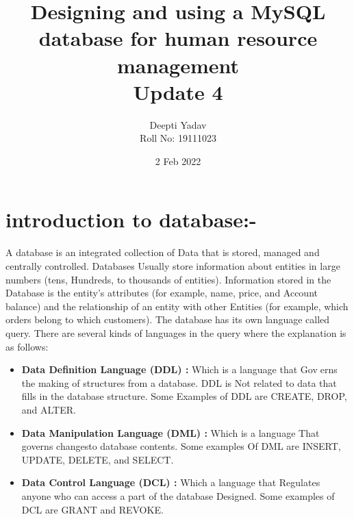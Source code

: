 \documentclass{article}
\title{ Designing and using a MySQL database for human resource management\\ Update 4}
\date{2 Feb 2022}
\author{Deepti Yadav\\ Roll No: 19111023 }
\begin{document}
\maketitle
\section*{introduction to database:-}
A database is an integrated collection of Data that is stored, managed and
centrally controlled. Databases Usually store information about entities in
large numbers (tens, Hundreds, to thousands of entities). Information stored
in the Database is the entity’s attributes (for example, name, price, and
Account balance) and the relationship of an entity with other Entities (for
example, which orders belong to which customers). The database has its
own language called query. There are several kinds of languages in the query
where the explanation is as follows:
\\
\begin{itemize}
    \item \textbf{Data Definition Language (DDL) :} Which is a language that Governs the making of structures from a database. DDL is Not related to
data that fills in the database structure. Some Examples of DDL are
CREATE, DROP, and ALTER.
\\
\item \textbf{Data Manipulation Language (DML) : } Which is a language That
governs changesto database contents. Some examples Of DML are
INSERT, UPDATE, DELETE, and SELECT.
\\
\item \textbf{Data Control Language (DCL) : } Which a language that Regulates
anyone who can access a part of the database Designed. Some examples
of DCL are GRANT and REVOKE.

\end{itemize}
\end{document}
